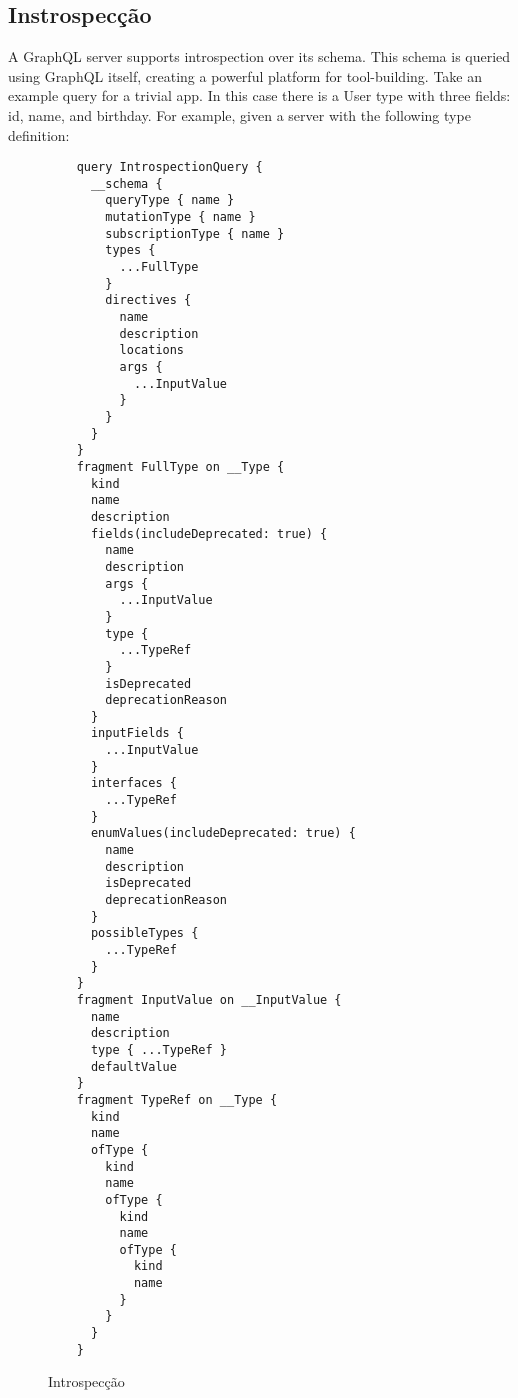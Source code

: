 \subsection[Instrospecção]{Instrospecção}

A GraphQL server supports introspection over its schema. This schema is queried using GraphQL itself, creating a powerful platform for tool-building. Take an example query for a trivial app. In this case there is a User type with three fields: id, name, and birthday. For example, given a server with the following type definition:

\begin{figure}[H]
  \centering
  \begin{verbatim}
    query IntrospectionQuery {
      __schema {
        queryType { name }
        mutationType { name }
        subscriptionType { name }
        types {
          ...FullType
        }
        directives {
          name
          description
          locations
          args {
            ...InputValue
          }
        }
      }
    }
    fragment FullType on __Type {
      kind
      name
      description
      fields(includeDeprecated: true) {
        name
        description
        args {
          ...InputValue
        }
        type {
          ...TypeRef
        }
        isDeprecated
        deprecationReason
      }
      inputFields {
        ...InputValue
      }
      interfaces {
        ...TypeRef
      }
      enumValues(includeDeprecated: true) {
        name
        description
        isDeprecated
        deprecationReason
      }
      possibleTypes {
        ...TypeRef
      }
    }
    fragment InputValue on __InputValue {
      name
      description
      type { ...TypeRef }
      defaultValue
    }
    fragment TypeRef on __Type {
      kind
      name
      ofType {
        kind
        name
        ofType {
          kind
          name
          ofType {
            kind
            name
          }
        }
      }
    }
  \end{verbatim}
  \caption{Introspecção}
\end{figure}
